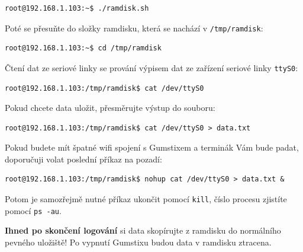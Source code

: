 \documentclass[11pt, a4paper]{article}
\begin{document}
\begin{lstlisting}
root@192.168.1.103:~$ ./ramdisk.sh
\end{lstlisting}

Poté se přesuňte do složky ramdisku, která se nachází v \texttt{/tmp/ramdisk}:

\begin{lstlisting}
root@192.168.1.103:~$ cd /tmp/ramdisk
\end{lstlisting}

Čtení dat ze seriové linky se prování výpisem dat ze zařízení seriové linky \texttt{ttyS0}:

\begin{lstlisting}
root@192.168.1.103:/tmp/ramdisk$ cat /dev/ttyS0
\end{lstlisting}

Pokud chcete data uložit, přesměrujte výstup do souboru:

\begin{lstlisting}
root@192.168.1.103:/tmp/ramdisk$ cat /dev/ttyS0 > data.txt
\end{lstlisting}

Pokud budete mít špatné wifi spojení s Gumstixem a terminák Vám bude padat, doporučuji volat poslední příkaz na pozadí:

\begin{lstlisting}
root@192.168.1.103:/tmp/ramdisk$ nohup cat /dev/ttyS0 > data.txt &
\end{lstlisting}

Potom je samozřejmě nutné příkaz ukončit pomocí \texttt{kill}, číslo procesu zjistíte pomocí \texttt{ps -au}.

\textbf{Ihned po skončení logování} si data skopírujte z ramdisku do normálního pevného uložiště! Po vypnutí Gumstixu budou data v ramdisku ztracena.
\end{document}
